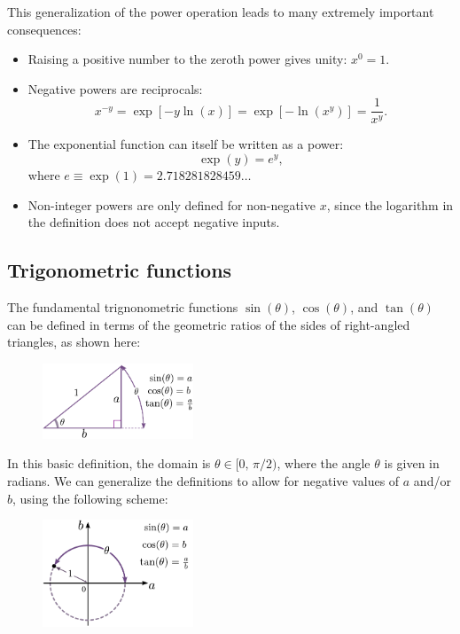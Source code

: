 \documentclass[10pt,a4paper]{article}
\begin{document}
This generalization of the power operation leads to many extremely
important consequences:
\begin{itemize}
\item 
  Raising a positive number to the zeroth power gives unity:
  $\displaystyle x^0 = 1$.
\item
  Negative powers are reciprocals:
  \begin{equation*}
    x^{-y} =
    \exp[-y\ln(x)] = \exp[-\ln(x^y)] = \frac{1}{x^y}.
  \end{equation*}

\item
  The exponential function can itself be written as a power:
  \begin{equation*}
    \exp(y) = e^y,
  \end{equation*}
  where $e \equiv \exp(1) = 2.718281828459\dots$
\item
  Non-integer powers are only defined for non-negative $x$, since the
  logarithm in the definition does not accept negative inputs.
\end{itemize}

\subsection{Trigonometric functions}
\label{trigo}

The fundamental trignonometric functions $\sin(\theta)$,
$\cos(\theta)$, and $\tan(\theta)$ can be defined in terms of the
geometric ratios of the sides of right-angled triangles, as shown here:

\begin{figure}[h]
  \centering\includegraphics[width=0.4\textwidth]{trigonometry}
\end{figure}

In this basic definition, the domain is $\theta \in [0, \,\pi/2)$,
  where the angle $\theta$ is given in radians. We can generalize the
  definitions to allow for negative values of $a$ and/or $b$, using
  the following scheme:

\begin{figure}[h]
  \centering\includegraphics[width=0.4\textwidth]{trigonometry2}
\end{figure}
\end{document}
